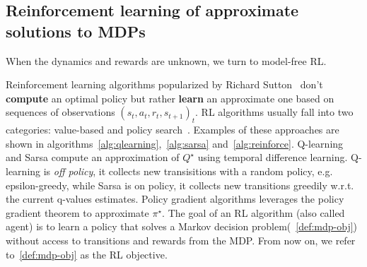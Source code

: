 \subsection{Reinforcement learning of approximate solutions to MDPs}\label{sec:rl}
When the dynamics and rewards are unknown, we turn to model-free RL. 

Reinforcement learning algorithms popularized by Richard Sutton~\cite{sutton} don't \textbf{compute} an optimal policy but rather \textbf{learn} an approximate one based on sequences of observations ${(s_t, a_t, r_t, s_{t+1})}_t$.
RL algorithms usually fall into two categories: value-based and policy search~\cite{pg_sutton}.
Examples of these approaches are shown in algorithms~\ref{alg:qlearning},~\ref{alg:sarsa} and~\ref{alg:reinforce}.
Q-learning and Sarsa compute an approximation of $Q^{\star}$ using temporal difference learning. Q-learning is \textit{off policy}, it collects new transisitions with a random policy, e.g. epsilon-greedy, while Sarsa is on policy, it collects new transitions greedily w.r.t. the current q-values estimates.
Policy gradient algorithms leverages the policy gradient theorem to approximate $\pi^{\star}$.
The goal of an RL algorithm (also called agent) is to learn a policy that solves a Markov decision problem(~\ref{def:mdp-obj}) without access to transitions and rewards from the MDP.
From now on, we refer to~\ref{def:mdp-obj} as the RL objective.

